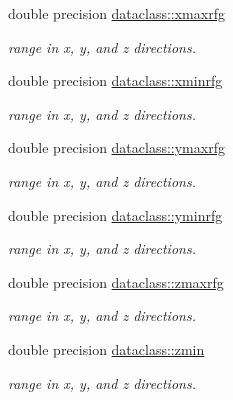 \textbf{ }\par
\begin{DoxyCompactItemize}
\item 
double precision \mbox{\hyperlink{namespacedataclass_a32b5b26da65d1b3507a36c17029a18ae}{dataclass\+::xmaxrfg}}
\begin{DoxyCompactList}\small\item\em range in x, y, and z directions. \end{DoxyCompactList}\item 
double precision \mbox{\hyperlink{namespacedataclass_ab5b5b652fce1e93de12accd3514958a0}{dataclass\+::xminrfg}}
\begin{DoxyCompactList}\small\item\em range in x, y, and z directions. \end{DoxyCompactList}\item 
double precision \mbox{\hyperlink{namespacedataclass_a79212aa125148748cc4bd5a11fff492f}{dataclass\+::ymaxrfg}}
\begin{DoxyCompactList}\small\item\em range in x, y, and z directions. \end{DoxyCompactList}\item 
double precision \mbox{\hyperlink{namespacedataclass_a5393ad3032e6f0311c62d03d468a6cf0}{dataclass\+::yminrfg}}
\begin{DoxyCompactList}\small\item\em range in x, y, and z directions. \end{DoxyCompactList}\item 
double precision \mbox{\hyperlink{namespacedataclass_a52b6a1ee39c205fce4ef2be72ab153aa}{dataclass\+::zmaxrfg}}
\begin{DoxyCompactList}\small\item\em range in x, y, and z directions. \end{DoxyCompactList}\item 
double precision \mbox{\hyperlink{namespacedataclass_a9c2398fd87701d5c0de37ff6b3357a0c}{dataclass\+::zmin}}
\begin{DoxyCompactList}\small\item\em range in x, y, and z directions. \end{DoxyCompactList}\end{DoxyCompactItemize}

